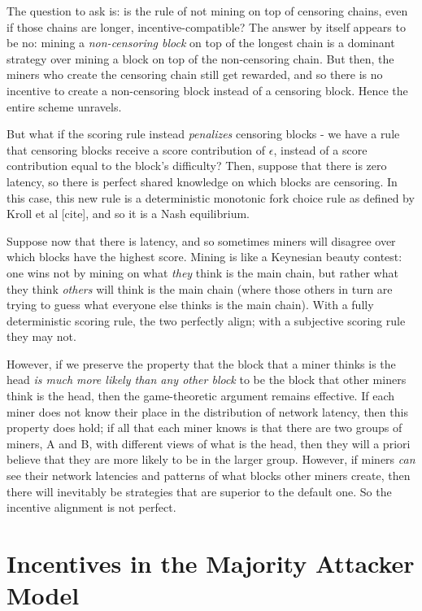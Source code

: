 \documentclass[12pt]{article}
\begin{document}
The question to ask is: is the rule of not mining on top of censoring chains, even if those chains are longer, incentive-compatible? The answer by itself appears to be no: mining a \textit{non-censoring block} on top of the longest chain is a dominant strategy over mining a block on top of the non-censoring chain. But then, the miners who create the censoring chain still get rewarded, and so there is no incentive to create a non-censoring block instead of a censoring block. Hence the entire scheme unravels.

But what if the scoring rule instead \textit{penalizes} censoring blocks - we have a rule that censoring blocks receive a score contribution of $\epsilon$, instead of a score contribution equal to the block's difficulty? Then, suppose that there is zero latency, so there is perfect shared knowledge on which blocks are censoring. In this case, this new rule is a deterministic monotonic fork choice rule as defined by Kroll et al [cite], and so it is a Nash equilibrium.

Suppose now that there is latency, and so sometimes miners will disagree over which blocks have the highest score. Mining is like a Keynesian beauty contest: one wins not by mining on what \textit{they} think is the main chain, but rather what they think \textit{others} will think is the main chain (where those others in turn are trying to guess what everyone else thinks is the main chain). With a fully deterministic scoring rule, the two perfectly align; with a subjective scoring rule they may not.

However, if we preserve the property that the block that a miner thinks is the head \textit{is much more likely than any other block} to be the block that other miners think is the head, then the game-theoretic argument remains effective. If each miner does not know their place in the distribution of network latency, then this property does hold; if all that each miner knows is that there are two groups of miners, A and B, with different views of what is the head, then they will a priori believe that they are more likely to be in the larger group. However, if miners \textit{can} see their network latencies and patterns of what blocks other miners create, then there will inevitably be strategies that are superior to the default one. So the incentive alignment is not perfect.

\section{Incentives in the Majority Attacker Model}
\end{document}

